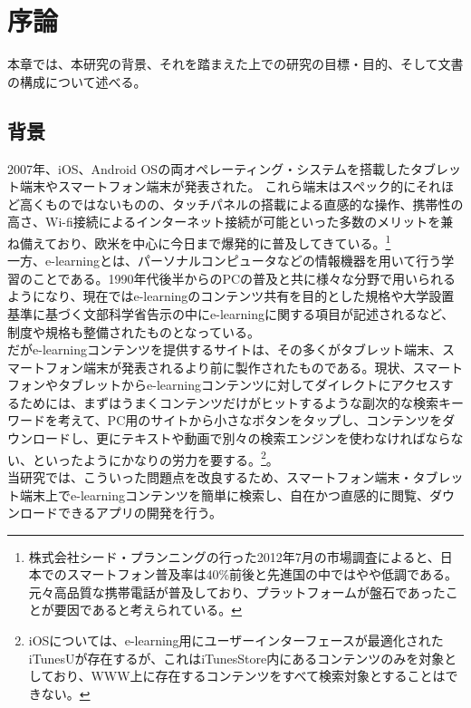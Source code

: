 \chapter{序論}
\label{chap:introduction}

本章では、本研究の背景、それを踏まえた上での研究の目標・目的、そして文書の構成について述べる。

\section{背景}

2007年、iOS、Android OSの両オペレーティング・システムを搭載したタブレット端末やスマートフォン端末が発表された。
これら端末はスペック的にそれほど高くものではないものの、タッチパネルの搭載による直感的な操作、携帯性の高さ、Wi-fi接続によるインターネット接続が可能といった多数のメリットを兼ね備えており、欧米を中心に今日まで爆発的に普及してきている。\footnote{株式会社シード・プランニングの行った2012年7月の市場調査\cite{smartphoneresearch}によると、日本でのスマートフォン普及率は40\%前後と先進国の中ではやや低調である。元々高品質な携帯電話が普及しており、プラットフォームが盤石であったことが要因であると考えられている。}\\
一方、e-learningとは、パーソナルコンピュータなどの情報機器を用いて行う学習のことである。1990年代後半からのPCの普及と共に様々な分野で用いられるようになり、現在ではe-learningのコンテンツ共有を目的とした規格\cite{scorm}や大学設置基準に基づく文部科学省告示の中にe-learningに関する項目が記述される\cite{monkasho}など、制度や規格も整備されたものとなっている。\\
だがe-learningコンテンツを提供するサイトは、その多くがタブレット端末、スマートフォン端末が発表されるより前に製作されたものである。現状、スマートフォンやタブレットからe-learningコンテンツに対してダイレクトにアクセスするためには、まずはうまくコンテンツだけがヒットするような副次的な検索キーワードを考えて、PC用のサイトから小さなボタンをタップし、コンテンツをダウンロードし、更にテキストや動画で別々の検索エンジンを使わなければならない、といったようにかなりの労力を要する。\footnote{iOSについては、e-learning用にユーザーインターフェースが最適化されたiTunesU\cite{itunesu}が存在するが、これはiTunesStore内にあるコンテンツのみを対象としており、WWW上に存在するコンテンツをすべて検索対象とすることはできない。}。\\
当研究では、こういった問題点を改良するため、スマートフォン端末・タブレット端末上でe-learningコンテンツを簡単に検索し、自在かつ直感的に閲覧、ダウンロードできるアプリの開発を行う。


